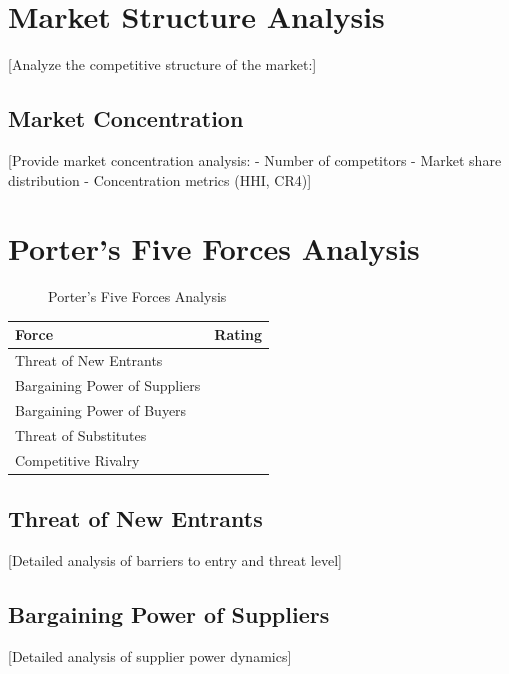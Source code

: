 \documentclass[11pt,letterpaper]{report}
\begin{document}
\section{Market Structure Analysis}

[Analyze the competitive structure of the market:]

\subsection{Market Concentration}

[Provide market concentration analysis:
- Number of competitors
- Market share distribution
- Concentration metrics (HHI, CR4)]

\section{Porter's Five Forces Analysis}


\begin{figure}[htbp]
\centering
\caption{Porter's Five Forces Analysis}
\label{fig:porter}
\end{figure}

\begin{porterbox}
\begin{tabular}{@{}ll@{}}
\textbf{Force} & \textbf{Rating} \\
\midrule
Threat of New Entrants & \riskmedium{} \\
Bargaining Power of Suppliers & \risklow{} \\
Bargaining Power of Buyers & \riskhigh{} \\
Threat of Substitutes & \risklow{} \\
Competitive Rivalry & \riskhigh{} \\
\end{tabular}
\end{porterbox}

\subsection{Threat of New Entrants}
[Detailed analysis of barriers to entry and threat level]

\subsection{Bargaining Power of Suppliers}
[Detailed analysis of supplier power dynamics]
\end{document}
